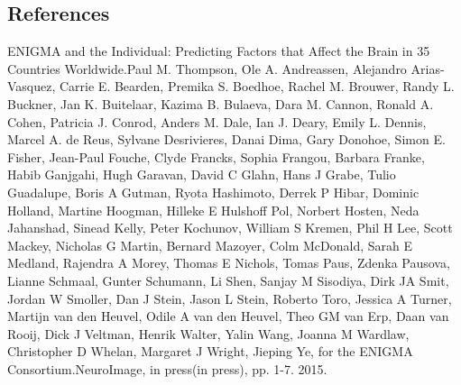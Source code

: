 \documentclass[twocolumn]{bmcart}%
\begin{document}
\begin{backmatter}
\section{References}\label{references}
ENIGMA and the Individual: Predicting Factors that Affect the Brain in 35 Countries Worldwide.Paul M. Thompson, Ole A. Andreassen, Alejandro Arias-Vasquez, Carrie E. Bearden, Premika S. Boedhoe, Rachel M. Brouwer, Randy L. Buckner, Jan K. Buitelaar, Kazima B. Bulaeva, Dara M. Cannon, Ronald A. Cohen, Patricia J. Conrod, Anders M. Dale, Ian J. Deary, Emily L. Dennis, Marcel A. de Reus, Sylvane Desrivieres, Danai Dima, Gary Donohoe, Simon E. Fisher, Jean-Paul Fouche, Clyde Francks, Sophia Frangou, Barbara Franke, Habib Ganjgahi, Hugh Garavan, David C Glahn, Hans J Grabe, Tulio Guadalupe, Boris A Gutman, Ryota Hashimoto, Derrek P Hibar, Dominic Holland, Martine Hoogman, Hilleke E Hulshoff Pol, Norbert Hosten, Neda Jahanshad, Sinead Kelly, Peter Kochunov, William S Kremen, Phil H Lee, Scott Mackey, Nicholas G Martin, Bernard Mazoyer, Colm McDonald, Sarah E Medland, Rajendra A Morey, Thomas E Nichols, Tomas Paus, Zdenka Pausova, Lianne Schmaal, Gunter Schumann, Li Shen, Sanjay M Sisodiya, Dirk JA Smit, Jordan W Smoller, Dan J Stein, Jason L Stein, Roberto Toro, Jessica A Turner, Martijn van den Heuvel, Odile A van den Heuvel, Theo GM van Erp, Daan van Rooij, Dick J Veltman, Henrik Walter, Yalin Wang, Joanna M Wardlaw, Christopher D Whelan, Margaret J Wright, Jieping Ye, for the ENIGMA Consortium.NeuroImage, in press(in press), pp. 1-7. 2015.


\end{backmatter}
\end{document}
